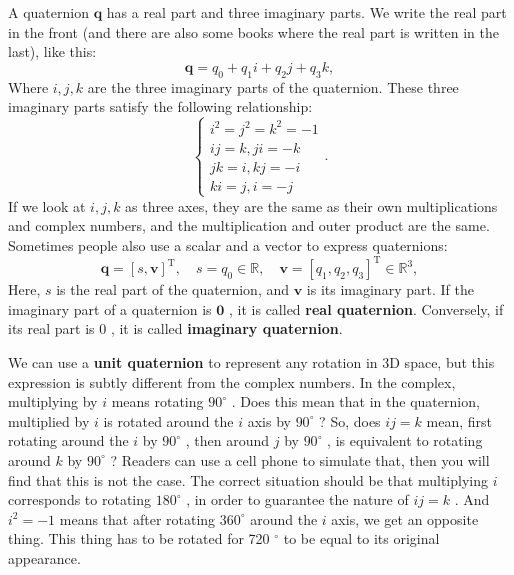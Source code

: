 A quaternion $ \mathbf{q} $ has a real part and three imaginary parts. We write the real part in the front (and there are also some books where the real part is written in the last), like this:
\begin{equation}
\mathbf{q} = q_0 + q_1 i + q_2 j + q_3 k,
\end{equation}
Where $ i,j,k $ are the three imaginary parts of the quaternion. These three imaginary parts satisfy the following relationship:
\begin{equation}
\label{eq:quaternionVirtual}
\left\{ \begin{array}{l}
{i^2} = {j^2} = {k^2} =  - 1\\
ij = k, ji = - k \\
jk = i,kj =  - i\\
ki = j, i = - j
\end{array} \right. .
\end{equation}
If we look at $ i, j, k $ as three axes, they are the same as their own multiplications and complex numbers, and the multiplication and outer product are the same. Sometimes people also use a scalar and a vector to express quaternions:
\[
\mathbf{q} = \left[ s, \mathbf{v} \right]^\mathrm{T}, \quad s=q_0 \in \mathbb{R},\quad \mathbf{v} = [q_1, q_2, q_3]^\mathrm{T} \in \mathbb{R}^3,
\]
Here, $ s $ is the real part of the quaternion, and $ \mathbf {v} $ is its imaginary part. If the imaginary part of a quaternion is $ \mathbf {0} $ , it is called \textbf{real quaternion}. Conversely, if its real part is $ 0 $ , it is called \textbf{imaginary quaternion}.

We can use a \textbf{unit quaternion} to represent any rotation in 3D space, but this expression is subtly different from the complex numbers. In the complex, multiplying by $ i $ means rotating $ 90 ^ \circ $ . Does this mean that in the quaternion, multiplied by $ i $ is rotated around the $ i $ axis by $ 90 ^ \circ $ ? So, does $ ij = k $ mean, first rotating around the $ i $ by $ 90 ^ \circ $ , then around $j$ by $ 90 ^ \circ $ , is equivalent to rotating around $ k$ by $ 90 ^ \circ $ ? Readers can use a cell phone to simulate that, then you will find that this is not the case. The correct situation should be that multiplying $ i $ corresponds to rotating $ 180 ^ \circ $ , in order to guarantee the nature of $ ij=k $ . And $ i^ 2 =- 1 $ means that after rotating $ 360 ^ \circ $ around the $ i $ axis, we get an opposite thing. This thing has to be rotated for 720 $^\circ$ to be equal to its original appearance.

